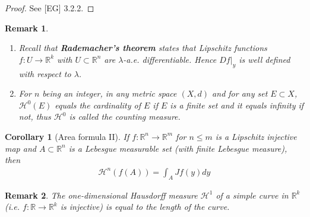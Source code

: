 \documentclass[12pt, a4paper, titlepage]{article}
\newtheorem{corollary}{Corollary}
\newtheorem{remark}{Remark}
\begin{document}
\begin{proof} See [EG] 3.2.2. %
\end{proof}
 \begin{remark} \ \begin{enumerate} 
\item Recall that \textbf{Rademacher's theorem} states that Lipschitz functions $f:U  \to \mathbb{R}^k$ with $U \subset \mathbb{R}^n$ are $\lambda$-a.e. differentiable. Hence $Df|_y$ is well defined with respect to $\lambda$. 
\item For $n$ being an integer, in any metric space $(X,d)$ and for any set $E \subset X$, $\mathcal{H}^0(E)$ equals the cardinality of $E$ if $E$ is a finite set and it equals infinity if not, thus $\mathcal{H}^0$ is called the counting measure. 
\end{enumerate} 
\end{remark}
\newpage
\begin{corollary}[Area formula II]If $f: \mathbb{R}^n \to \mathbb{R}^m$ for $n \leq m$ is a Lipschitz injective map and $A \subset \mathbb{R}^n$ is a Lebesgue measurable set (with finite Lebesgue measure), then 
\begin{align*}
\mathcal{H}^n (f(A)) = \int_A Jf(y)dy
\end{align*}
\end{corollary} 
\begin{remark} The one-dimensional Hausdorff measure $\mathcal{H}^1$ of a simple curve in $\mathbb{R}^k$ (i.e. $f: \mathbb{R} \to \mathbb{R}^k$ is injective) is equal to the length of the curve. 
\end{remark}
\end{document}
